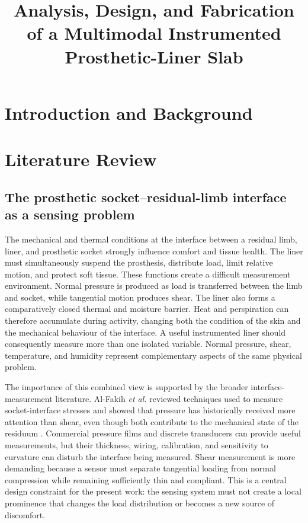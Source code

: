 \documentclass[12pt,a4paper]{article}
\title{Analysis, Design, and Fabrication of a Multimodal Instrumented Prosthetic-Liner Slab}
\author{}
\date{}
\begin{document}
\maketitle

\section{Introduction and Background}
\label{sec:introduction}


\section{Literature Review}
\label{sec:literature-review}

\subsection{The prosthetic socket--residual-limb interface as a sensing problem}

The mechanical and thermal conditions at the interface between a residual limb,
liner, and prosthetic socket strongly influence comfort and tissue health.
The liner must simultaneously suspend the prosthesis, distribute load, limit
relative motion, and protect soft tissue. These functions create a difficult
measurement environment. Normal pressure is produced as load is transferred
between the limb and socket, while tangential motion produces shear. The liner
also forms a comparatively closed thermal and moisture barrier. Heat and
perspiration can therefore accumulate during activity, changing both the
condition of the skin and the mechanical behaviour of the interface. A useful
instrumented liner should consequently measure more than one isolated variable.
Normal pressure, shear, temperature, and humidity represent complementary
aspects of the same physical problem.

The importance of this combined view is supported by the broader interface-
measurement literature. Al-Fakih \textit{et al.} reviewed techniques used to
measure socket-interface stresses and showed that pressure has historically
received more attention than shear, even though both contribute to the
mechanical state of the residuum \cite{alfakih2016}. Commercial pressure films
and discrete transducers can provide useful measurements, but their thickness,
wiring, calibration, and sensitivity to curvature can disturb the interface
being measured. Shear measurement is more demanding because a sensor must
separate tangential loading from normal compression while remaining sufficiently
thin and compliant. This is a central design constraint for the present work:
the sensing system must not create a local prominence that changes the load
distribution or becomes a new source of discomfort.
\end{document}
